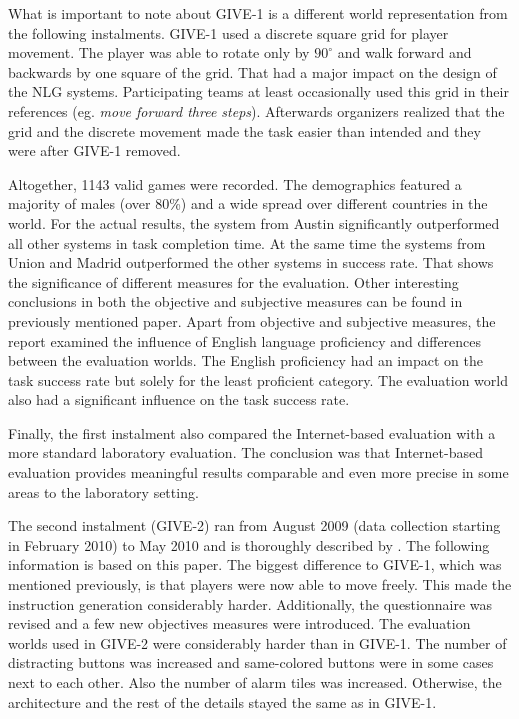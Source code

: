 What is important to note about GIVE-1 is a different world representation from the following instalments. GIVE-1 used a discrete square grid for player movement. The player was able to rotate only by $90^{\circ}$ and walk forward and backwards by one square of the grid. That had a major impact on the design of the NLG systems. Participating teams at least occasionally used this grid in their references (eg. \textit{move forward three steps}). Afterwards organizers realized that the grid and the discrete movement made the task easier than intended and they were after GIVE-1 removed.

Altogether, 1143 valid games were recorded. The demographics featured a majority of males (over 80\%) and a wide spread over different countries in the world. For the actual results,  the system from Austin significantly outperformed all other systems in task completion time. At the same time the systems from Union and Madrid outperformed the other systems in success rate. That shows the significance of different measures for the evaluation. Other interesting conclusions in both the objective and subjective measures can be found in previously mentioned paper. Apart from objective and subjective measures, the report examined the influence of English language proficiency and differences between the evaluation worlds. The English proficiency had an impact on the task success rate but solely for the least proficient category. The evaluation world also had a significant influence on the task success rate.

Finally, the first instalment also compared the Internet-based evaluation with a more standard laboratory evaluation. The conclusion was that Internet-based evaluation provides meaningful results comparable and even more precise in some areas to the laboratory setting.

The second instalment (GIVE-2) ran from August 2009 (data collection starting in February 2010) to May 2010 and is thoroughly described by \citet{koller2010report}. The following information is based on this paper. The biggest difference to GIVE-1, which was mentioned previously, is that players were now able to move freely. This made the instruction generation considerably harder. Additionally, the questionnaire was revised and a few new objectives measures were introduced. The evaluation worlds used in GIVE-2 were considerably harder than in GIVE-1. The number of distracting buttons was increased and same-colored buttons were in some cases next to each other. Also the number of alarm tiles was increased. Otherwise, the architecture and the rest of the details stayed the same as in GIVE-1.

